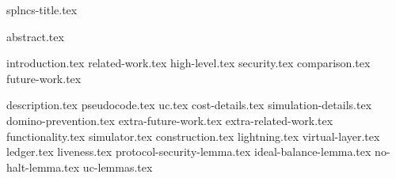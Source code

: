 \documentclass{llncs}
\begin{document}
\pagestyle{plain}
{splncs-title.tex}
\maketitle
{abstract.tex}



{introduction.tex}
{related-work.tex}
{high-level.tex}
{security.tex}
{comparison.tex}
{future-work.tex}

\makeatletter%
%
  {\appendices}%
  {\appendix}%
\makeatother%
{description.tex}
{pseudocode.tex}
{uc.tex}
{cost-details.tex}
{simulation-details.tex}
{domino-prevention.tex}
{extra-future-work.tex}
{extra-related-work.tex}
{functionality.tex}
{simulator.tex}
{construction.tex}
{lightning.tex}
{virtual-layer.tex}
{ledger.tex}
{liveness.tex}
{protocol-security-lemma.tex}
{ideal-balance-lemma.tex}
{no-halt-lemma.tex}
{uc-lemmas.tex}
\end{document}
